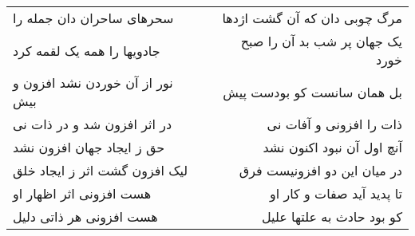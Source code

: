 \begin{center}
\begin{longtable}{l p{0.5cm} r}
سحرهای ساحران دان جمله را
&&
مرگ چوبی دان که آن گشت اژدها
\\
جادویها را همه یک لقمه کرد
&&
یک جهان پر شب بد آن را صبح خورد
\\
نور از آن خوردن نشد افزون و بیش
&&
بل همان سانست کو بودست پیش
\\
در اثر افزون شد و در ذات نی
&&
ذات را افزونی و آفات نی
\\
حق ز ایجاد جهان افزون نشد
&&
آنچ اول آن نبود اکنون نشد
\\
لیک افزون گشت اثر ز ایجاد خلق
&&
در میان این دو افزونیست فرق
\\
هست افزونی اثر اظهار او
&&
تا پدید آید صفات و کار او
\\
هست افزونی هر ذاتی دلیل
&&
کو بود حادث به علتها علیل
\\
\end{longtable}
\end{center}
